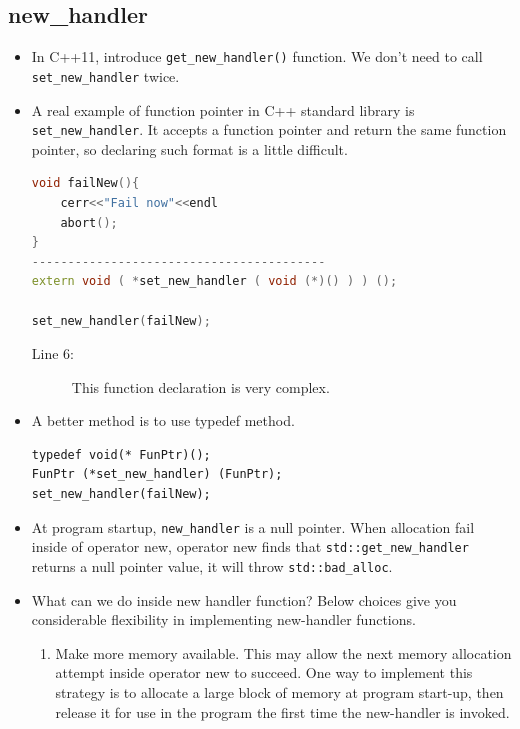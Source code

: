 \documentclass[a4paper,11pt,twoside]{book}
\begin{document}
\subsection{new\_handler}
\begin{itemize}	
	\item In C++11, introduce \texttt{get\_new\_handler()} function. We don't need to call \texttt{set\_new\_handler} twice. 
	
	\item A real example of function pointer in C++ standard library is \texttt{set\_new\_handler}. It accepts a function pointer and return the same function pointer, so declaring such format is a little difficult.
\begin{lstlisting}[frame=single, language=c++]
void failNew(){
	cerr<<"Fail now"<<endl
	abort();
}
-----------------------------------------
extern void ( *set_new_handler ( void (*)() ) ) ();
			
set_new_handler(failNew);
\end{lstlisting}
		\begin{description}
			\item[Line 6:] This function declaration is very complex. 
		\end{description}
		
		\item A better method is to use typedef method.
		
\begin{lstlisting}[numbers = none]
typedef void(* FunPtr)();
FunPtr (*set_new_handler) (FunPtr);
set_new_handler(failNew);
\end{lstlisting}	
	
	\item At program startup, \texttt{new\_handler} is a null pointer. When allocation fail inside of operator new, operator new finds that \texttt{std::get\_new\_handler} returns a null pointer value, it will throw \texttt{std::bad\_alloc}.
	
	\item What can we do inside new handler function? Below choices give you considerable flexibility in implementing new-handler functions.
\begin{enumerate}
	
	\item Make more memory available. This may allow the next memory allocation attempt inside operator new to succeed. One way to implement this strategy is to allocate a large block of memory at program start-up, then release it for use in the program the first time the new-handler is invoked.
	

\end{enumerate}
\end{itemize}
\end{document}
